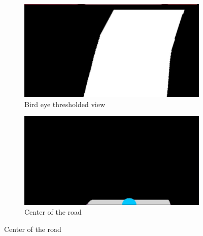 \documentclass[12pt,a4paper]{article}
\begin{document}
\begin{large}
\begin{figure} [!hbp]
\begin{subfigure}[b]{0.3\textwidth}
    \end{subfigure}
  \end{figure}

\begin{figure} [!hbp]
  \centering
    \begin{subfigure}[b]{0.3\textwidth}
    \centering
    \captionsetup{justification=centering}
      \includegraphics[width=\textwidth]{images/warptr.jpg}
      \caption{Bird eye thresholded view}
      
    \end{subfigure}
    \hspace{0.1cm}
    \begin{subfigure}[b]{0.3\textwidth}
    \centering
    \captionsetup{justification=centering}
      \includegraphics[width=\textwidth]{images/base.jpg}
      \caption{Center of the road \\}
      

\end{subfigure}
\end{figure}
\end{large}
\end{document}
